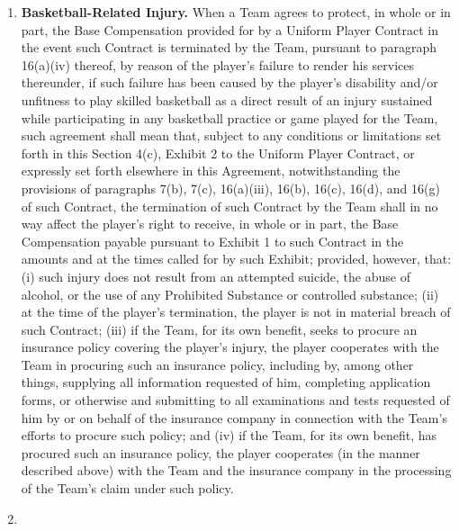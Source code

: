 \documentclass[
]{book}
\begin{document}
\begin{enumerate}
\item
  \textbf{Basketball-Related Injury.} When a Team agrees to protect, in whole or in part, the Base Compensation provided for by a Uniform Player Contract in the event such Contract is terminated by the Team, pursuant to paragraph 16(a)(iv) thereof, by reason of the player's failure to render his services thereunder, if such failure has been caused by the player's disability and/or unfitness to play skilled basketball as a direct result of an injury sustained while participating in any basketball practice or game played for the Team, such agreement shall mean that, subject to any conditions or limitations set forth in this Section 4(c), Exhibit 2 to the Uniform Player Contract, or expressly set forth elsewhere in this Agreement, notwithstanding the provisions of paragraphs 7(b), 7(c), 16(a)(iii), 16(b), 16(c), 16(d), and 16(g) of such Contract, the termination of such Contract by the Team shall in no way affect the player's right to receive, in whole or in part, the Base Compensation payable pursuant to Exhibit 1 to such Contract in the amounts and at the times called for by such Exhibit; provided, however, that: (i) such injury does not result from an attempted suicide, the abuse of alcohol, or the use of any Prohibited Substance or controlled substance; (ii) at the time of the player's termination, the player is not in material breach of such Contract; (iii) if the Team, for its own benefit, seeks to procure an insurance policy covering the player's injury, the player cooperates with the Team in procuring such an insurance policy, including by, among other things, supplying all information requested of him, completing application forms, or otherwise and submitting to all examinations and tests requested of him by or on behalf of the insurance company in connection with the Team's efforts to procure such policy; and (iv) if the Team, for its own benefit, has procured such an insurance policy, the player cooperates (in the manner described above) with the Team and the insurance company in the processing of the Team's claim under such policy.
\item

\end{enumerate}
\end{document}
